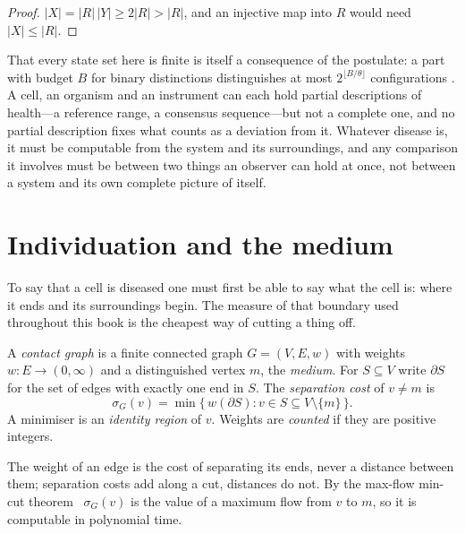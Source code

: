\begin{proof}
$|X|=|R|\,|Y|\ge2|R|>|R|$, and an injective map into $R$ would need
$|X|\le|R|$.
\end{proof}

That every state set here is finite is itself a consequence of the
postulate: a part with budget $B$ for binary distinctions distinguishes at
most $2^{\lfloor B/\theta\rfloor}$ configurations \lnkD. A cell, an
organism and an instrument can each hold partial descriptions of health---a
reference range, a consensus sequence---but not a complete one, and no
partial description fixes what counts as a deviation from it. Whatever
disease is, it must be computable from the system and its surroundings, and
any comparison it involves must be between two things an observer can hold
at once, not between a system and its own complete picture of itself.

\section{Individuation and the medium}
\label{c1:sec-individuation}

To say that a cell is diseased one must first be able to say what the cell
is: where it ends and its surroundings begin. The measure of that boundary
used throughout this book is the cheapest way of cutting a thing off.

\begin{definition}
\label{c1:def-contact}
A \emph{contact graph} is a finite connected graph $G=(V,E,w)$ with weights
$w:E\to(0,\infty)$ and a distinguished vertex $m$, the \emph{medium}. For
$S\subseteq V$ write $\partial S$ for the set of edges with exactly one end
in $S$. The \emph{separation cost} of $v\ne m$ is
\begin{equation}
\sigma_G(v)=\min\{\,w(\partial S): v\in S\subseteq V\setminus\{m\}\,\}.
\label{c1:eq-sep}
\end{equation}
A minimiser is an \emph{identity region} of $v$. Weights are \emph{counted}
if they are positive integers.
\end{definition}

The weight of an edge is the cost of separating its ends, never a distance
between them; separation costs add along a cut, distances do not. By the
max-flow min-cut theorem~\citep{fordfulkerson1956} $\sigma_G(v)$ is the
value of a maximum flow from $v$ to $m$, so it is computable in polynomial
time. \lnkS

